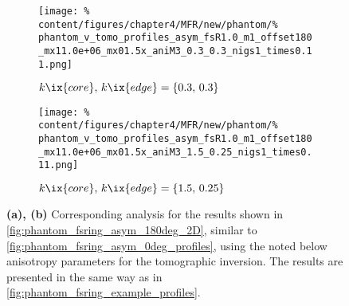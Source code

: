                 \begin{figure}[t]%
                    \centering%
                    \begin{subfigure}{\textwidth}%
                        \centering%
                        \texttt{[image: \%
                            content/figures/chapter4/MFR/new/phantom/\%
                            phantom\_v\_tomo\_profiles\_asym\_fsR1.0\_m1\_offset180\_mx11.0e+06\_mx01.5x\_aniM3\_0.3\_0.3\_nigs1\_times0.11.png]}%
                        \caption{$k\ix{core},\,k\ix{edge}=\left\{0.3,\,0.3\right\}$}%
                    \end{subfigure}%
                    \newline%
                    \begin{subfigure}{\textwidth}%
                        \centering%
                        \texttt{[image: \%
                            content/figures/chapter4/MFR/new/phantom/\%
                            phantom\_v\_tomo\_profiles\_asym\_fsR1.0\_m1\_offset180\_mx11.0e+06\_mx01.5x\_aniM3\_1.5\_0.25\_nigs1\_times0.11.png]}%
                        \caption{$k\ix{core},\,k\ix{edge}=\left\{1.5,\,0.25\right\}$}%
                    \end{subfigure}%
                    \caption{\textbf{(a), (b)} Corresponding analysis for the results shown in \cref{fig:phantom_fsring_asym_180deg_2D}, similar to \cref{fig:phantom_fsring_asym_0deg_profiles}, using the noted below anisotropy parameters for the tomographic inversion. The results are presented in the same way as in \cref{fig:phantom_fsring_example_profiles}.}\label{fig:phantom_fsring_asym_180deg_profiles}%
                \end{figure}%
%
